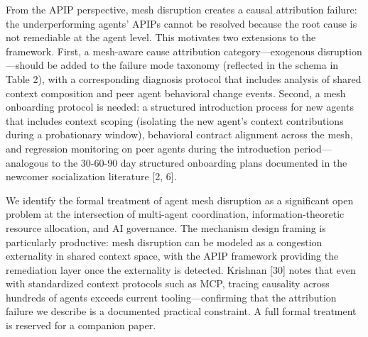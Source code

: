 From the APIP perspective, mesh disruption creates a causal attribution failure: the underperforming agents' APIPs cannot be resolved because the root cause is not remediable at the agent level. This motivates two extensions to the framework. First, a mesh-aware cause attribution category---exogenous disruption---should be added to the failure mode taxonomy (reflected in the schema in Table 2), with a corresponding diagnosis protocol that includes analysis of shared context composition and peer agent behavioral change events. Second, a mesh onboarding protocol is needed: a structured introduction process for new agents that includes context scoping (isolating the new agent's context contributions during a probationary window), behavioral contract alignment across the mesh, and regression monitoring on peer agents during the introduction period---analogous to the 30-60-90 day structured onboarding plans documented in the newcomer socialization literature [2, 6].

We identify the formal treatment of agent mesh disruption as a significant open problem at the intersection of multi-agent coordination, information-theoretic resource allocation, and AI governance. The mechanism design framing is particularly productive: mesh disruption can be modeled as a congestion externality in shared context space, with the APIP framework providing the remediation layer once the externality is detected. Krishnan [30] notes that even with standardized context protocols such as MCP, tracing causality across hundreds of agents exceeds current tooling---confirming that the attribution failure we describe is a documented practical constraint. A full formal treatment is reserved for a companion paper.

